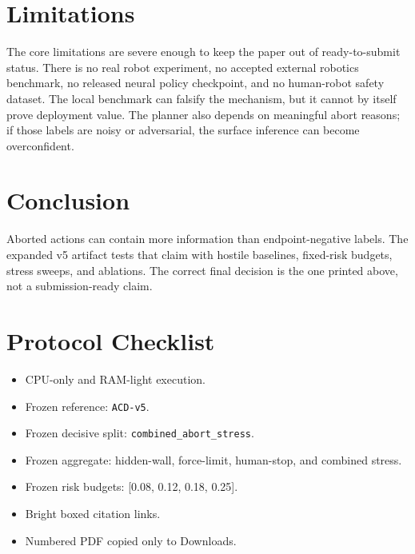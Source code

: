 \documentclass{article}
\begin{document}
\section{Limitations}
The core limitations are severe enough to keep the paper out of ready-to-submit status.  There is no real robot experiment, no accepted external robotics benchmark, no released neural policy checkpoint, and no human-robot safety dataset.  The local benchmark can falsify the mechanism, but it cannot by itself prove deployment value.  The planner also depends on meaningful abort reasons; if those labels are noisy or adversarial, the surface inference can become overconfident.

\section{Conclusion}
Aborted actions can contain more information than endpoint-negative labels.  The expanded v5 artifact tests that claim with hostile baselines, fixed-risk budgets, stress sweeps, and ablations.  The correct final decision is the one printed above, not a submission-ready claim.

\appendix
\section{Protocol Checklist}
\begin{itemize}
\item CPU-only and RAM-light execution.
\item Frozen reference: \texttt{ACD-v5}.
\item Frozen decisive split: \texttt{combined\_abort\_stress}.
\item Frozen aggregate: hidden-wall, force-limit, human-stop, and combined stress.
\item Frozen risk budgets: [0.08, 0.12, 0.18, 0.25].
\item Bright boxed citation links.
\item Numbered PDF copied only to Downloads.
\end{itemize}
\end{document}
